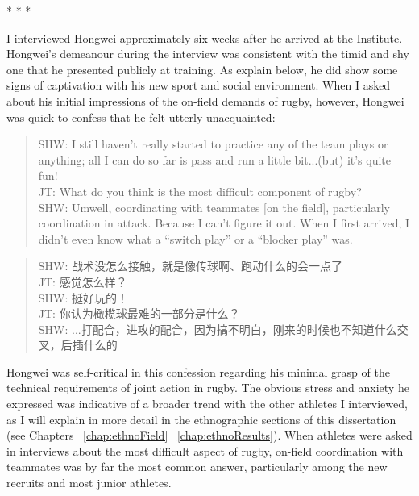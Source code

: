 \begin{CJK}{UTF8}{gbsn}
                        \begin{center}
                          * * *
                        \end{center}

I interviewed Hongwei approximately six weeks after he arrived at the Institute.  Hongwei's demeanour during the interview was consistent with the timid and shy one that he presented publicly at training.  As explain below, he did show some signs of captivation with his new sport and social environment.  When I asked about his initial impressions of the on-field demands of rugby, however, Hongwei was quick to confess that he felt utterly unacquainted:

  \begin{quote}
    SHW: I still haven’t really started to practice any of the team plays or anything; all I can do so far is pass and run a little bit...(but) it's quite fun! \\
    JT: What do you think is the most difficult component of rugby? \\
    SHW: Um\textellipsis well, coordinating with teammates [on the field], particularly coordination in attack.  Because I can't figure it out.  When I first arrived, I didn’t even know what a ``switch play'' or a ``blocker play'' was.
  \end{quote}

  \begin{quote}
    SHW: 战术没怎么接触，就是像传球啊、跑动什么的会一点了 \\
    JT: 感觉怎么样？\\
    SHW: 挺好玩的！\\
    JT: 你认为橄榄球最难的一部分是什么？ \\
    SHW: ...打配合，进攻的配合，因为搞不明白，刚来的时候也不知道什么交叉，后插什么的 \\
  \end{quote}

Hongwei was self-critical in this confession regarding his minimal grasp of the technical requirements of joint action in rugby.  The obvious stress and anxiety he expressed was indicative of a broader trend with the other athletes I interviewed, as I will explain in more detail in the ethnographic sections of this dissertation (see Chapters ~\ref{chap:ethnoField} \nobreakdash~\ref{chap:ethnoResults}). When athletes were asked in interviews about the most difficult aspect of rugby, on-field coordination with teammates was by far the most common answer, particularly among the new recruits and most junior athletes.


\end{CJK}
